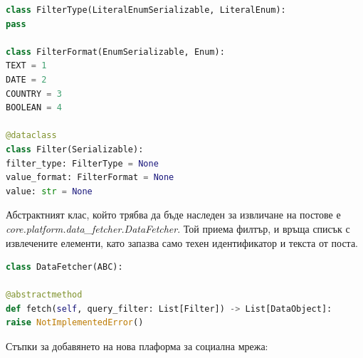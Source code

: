 \documentclass{article}
\newcounter{subsubsubsection}[subsubsection]
\begin{document}
\begin{lstlisting}[language=Python, caption=Класове дефиниращи елемент от филтъра.]
class FilterType(LiteralEnumSerializable, LiteralEnum):
pass

class FilterFormat(EnumSerializable, Enum):
TEXT = 1
DATE = 2
COUNTRY = 3
BOOLEAN = 4

@dataclass
class Filter(Serializable):
filter_type: FilterType = None
value_format: FilterFormat = None
value: str = None
\end{lstlisting}


Абстрактният клас, който трябва да бъде наследен за извличане на постове е
\textit{core.platform.data\_fetcher.DataFetcher}. Той приема филтър, и връща списък с извлечените елементи, като
запазва само техен идентификатор и текста от поста.

\begin{lstlisting}[language=Python, caption=Абстрактен клас дефиниращ интерфейс за извличане на постове.]
class DataFetcher(ABC):

@abstractmethod
def fetch(self, query_filter: List[Filter]) -> List[DataObject]:
raise NotImplementedError()
\end{lstlisting}


Стъпки за добавянето на нова плаформа за социална мрежа:
\end{document}
